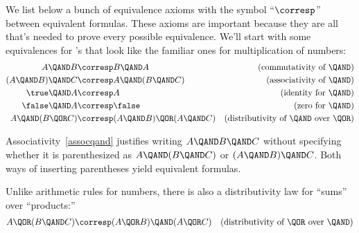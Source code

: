 We list below a bunch of equivalence axioms%
%
with the symbol ``$\corresp$'' between equivalent formulas.  These axioms are
important because they are all that's needed to prove every possible
equivalence.  We'll start with some equivalences for \QAND's that look
like the familiar ones for multiplication of numbers:
\begin{align}
A \QAND B           &\corresp B \QAND A
         & \text{(commutativity of \QAND)}\label{commutqand}\\
(A \QAND B)\QAND C  & \corresp A \QAND (B \QAND C)
         & \text{(associativity of \QAND)}\label{assocqand}\\
\true \QAND A           &\corresp A
         & \text{(identity for \QAND)}\notag\\
\false \QAND A          &\corresp \false
         & \text{(zero for \QAND)}\notag\\
A \QAND (B \QOR C) & \corresp (A \QAND B) \QOR (A \QAND C)
         & \text{(distributivity of \QAND\ over \QOR)}\label{distand}
\end{align}

Associativity~\eqref{assocqand} justifies writing $A \QAND B \QAND C$
without specifying whether it is parenthesized as $A \QAND (B \QAND
C)$ or $(A \QAND B) \QAND C$.  Both ways of inserting parentheses
yield equivalent formulas.

\iffalse

\begin{theorem}\label{thm:distribute-and-or}[Distributive Law of $\QAND$ over $\QOR$]%
\index{Distributive Law!$\QAND$ over $\QOR$|textbf}
\[
A \QAND (B \QOR C)\text{ is equivalent to } (A \QAND B) \QOR (A \QAND C).
\]
\end{theorem}
Theorem~\ref{thm:distribute-and-or} is called a \emph{distributive law}
because of its resemblance to the distributivity of products
over sums in arithmetic.
\fi

Unlike arithmetic rules for numbers, there is also a distributivity
law for ``sums'' over ``products:''
\begin{align}
A \QOR (B \QAND C) & \corresp (A \QOR B) \QAND (A \QOR C)
             & \text{(distributivity of \QOR\ over \QAND)}\label{distor}
\end{align}

\iffalse
Similarly, we have (Problem~\ref{TP_truth_table_for_distributive_law}):
\begin{theorem}\label{thm:distribute-or-and}[Distributive Law of $\QOR$ over $\QAND$]
\[
A \QOR (B \QAND C)\text{ is equivalent to } (A \QOR B) \QAND (A \QOR
C).
\]
\end{theorem}%
\index{Distributive Law!$\QOR$ over $\QAND$|textbf}
Note the contrast between Theorem~\ref{thm:distribute-or-and} and
arithmetic, where sums do not distribute over products.
\fi

